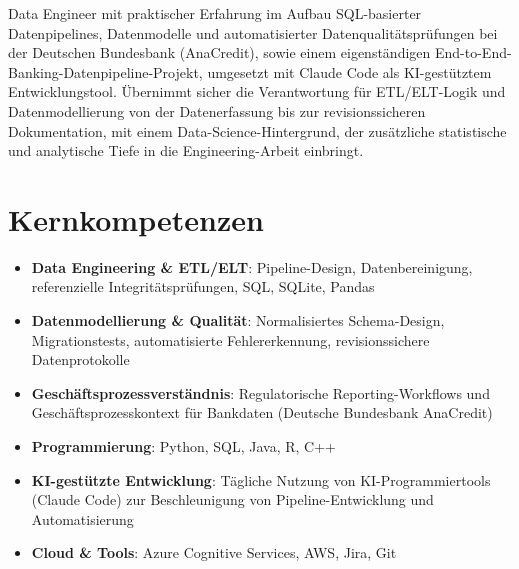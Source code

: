 \documentclass[11pt,a4paper,sans]{moderncv}
\begin{document}
\makecvtitle


\vspace{6pt}
\small{Data Engineer mit praktischer Erfahrung im Aufbau SQL-basierter Datenpipelines, Datenmodelle und automatisierter Datenqualitätsprüfungen bei der Deutschen Bundesbank (AnaCredit), sowie einem eigenständigen End-to-End-Banking-Datenpipeline-Projekt, umgesetzt mit Claude Code als KI-gestütztem Entwicklungstool. Übernimmt sicher die Verantwortung für ETL/ELT-Logik und Datenmodellierung von der Datenerfassung bis zur revisionssicheren Dokumentation, mit einem Data-Science-Hintergrund, der zusätzliche statistische und analytische Tiefe in die Engineering-Arbeit einbringt.}


\section{Kernkompetenzen}
\vspace{1pt}
\begin{itemize}

\item \textbf{Data Engineering \& ETL/ELT}: Pipeline-Design, Datenbereinigung, referenzielle Integritätsprüfungen, SQL, SQLite, Pandas

\item \textbf{Datenmodellierung \& Qualität}: Normalisiertes Schema-Design, Migrationstests, automatisierte Fehlererkennung, revisionssichere Datenprotokolle

\item \textbf{Geschäftsprozessverständnis}: Regulatorische Reporting-Workflows und Geschäftsprozesskontext für Bankdaten (Deutsche Bundesbank AnaCredit)

\item \textbf{Programmierung}: Python, SQL, Java, R, C++

\item \textbf{KI-gestützte Entwicklung}: Tägliche Nutzung von KI-Programmiertools (Claude Code) zur Beschleunigung von Pipeline-Entwicklung und Automatisierung

\item \textbf{Cloud \& Tools}: Azure Cognitive Services, AWS, Jira, Git

\end{itemize}
\end{document}
